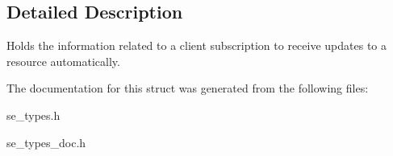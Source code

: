 \subsection{Detailed Description}
Holds the information related to a client subscription to receive updates to a resource automatically. 

The documentation for this struct was generated from the following files\+:\begin{DoxyCompactItemize}
\item 
se\+\_\+types.\+h\item 
se\+\_\+types\+\_\+doc.\+h\end{DoxyCompactItemize}
